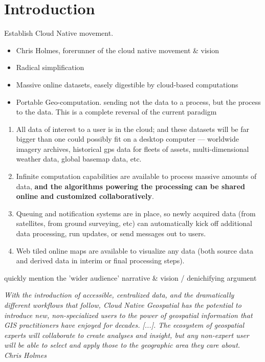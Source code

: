 \chapter{Introduction}

\m{->} Establish Cloud Native movement.

\begin{itemize}
  \item Chris Holmes, forerunner of the cloud native movement \& vision
  \item Radical simplification
  \item Massive online datasets, easely digestible by cloud-based computations
  \item Portable Geo-computation. sending not the data to a process, but the process to the data. This is a complete reversal of the current paradigm
\end{itemize}


\begin{enumerate}
  \item     All data of interest to a user is in the cloud; and these datasets will be far bigger than one could possibly fit on a desktop computer — worldwide imagery archives, historical gps data for fleets of assets, multi-dimensional weather data, global basemap data, etc.
  \item     Infinite computation capabilities are available to process massive amounts of data, \textbf{and the algorithms powering the processing can be shared online and customized collaboratively}.
  \item     Queuing and notification systems are in place, so newly acquired data (from satellites, from ground surveying, etc) can automatically kick off additional data processing, run updates, or send messages out to users.
  \item     Web tiled online maps are available to visualize any data (both source data and derived data in interim or final processing steps).
\end{enumerate}


\m{->} quickly mention the 'wider audience' narrative \& vision / denichifying argument

\emph{
  With the introduction of accessible, centralized data, and the dramatically different workflows that follow, Cloud Native Geospatial has the potential to introduce new, non-specialized users to the power of geospatial information that GIS practitioners have enjoyed for decades. [...]. The ecosystem of geospatial experts will collaborate to create analyses and insight, but any non-expert user will be able to select and apply those to the geographic area they care about. ~ Chris Holmes
}

